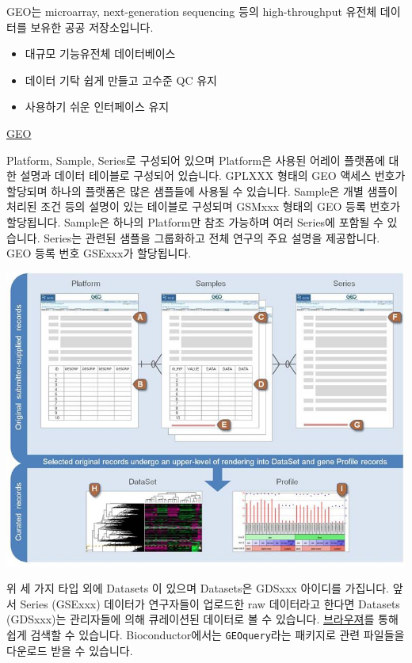 \documentclass[
]{book}
\providecommand{\tightlist}{%
  \setlength{\itemsep}{0pt}\setlength{\parskip}{0pt}}
\begin{document}
GEO는 microarray, next-generation sequencing 등의 high-throughput 유전체 데이터를 보유한 공공 저장소입니다.

\begin{itemize}
\tightlist
\item
  대규모 기능유전체 데이터베이스
\item
  데이터 기탁 쉽게 만들고 고수준 QC 유지
\item
  사용하기 쉬운 인터페이스 유지
\end{itemize}

\href{https://www.ncbi.nlm.nih.gov/geo/}{GEO}

Platform, Sample, Series로 구성되어 있으며 Platform은 사용된 어레이 플랫폼에 대한 설명과 데이터 테이블로 구성되어 있습니다. GPLXXX 형태의 GEO 액세스 번호가 할당되며 하나의 플랫폼은 많은 샘플들에 사용될 수 있습니다. Sample은 개별 샘플이 처리된 조건 등의 설명이 있는 테이블로 구성되며 GSMxxx 형태의 GEO 등록 번호가 할당됩니다. Sample은 하나의 Platform만 참조 가능하며 여러 Series에 포함될 수 있습니다. Series는 관련된 샘플을 그룹화하고 전체 연구의 주요 설명을 제공합니다. GEO 등록 번호 GSExxx가 할당됩니다.

\includegraphics[width=6.25in,height=\textheight]{images/04/geo_overview.jpg}

위 세 가지 타입 외에 Datasets 이 있으며 Datasets은 GDSxxx 아이디를 가집니다. 앞서 Series (GSExxx) 데이터가 연구자들이 업로드한 raw 데이터라고 한다면 Datasets (GDSxxx)는 관리자들에 의해 큐레이션된 데이터로 볼 수 있습니다. \href{https://www.ncbi.nlm.nih.gov/geo/summary/}{브라우져}를 통해 쉽게 검색할 수 있습니다. Bioconductor에서는 \texttt{GEOquery}라는 패키지로 관련 파일들을 다운로드 받을 수 있습니다.
\end{document}
